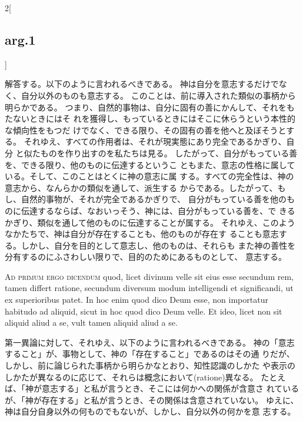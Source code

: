 \documentclass[paper=a4paper,fontsize=10pt,jafontsize=9pt,titlepage]{jlreq}
\begin{document}
\begin{paracol}{2}[\subsection{arg.1}]
\switchcolumn

解答する。以下のように言われるべきである。
神は自分を意志するだけでなく、自分以外のものも意志する。
このことは、前に導入された類似の事柄から明らかである。
つまり、自然的事物は、自分に固有の善にかんして、それをもたないときにはそ
 れを獲得し、もっているときにはそこに休らうという本性的な傾向性をもつだ
 けでなく、できる限り、その固有の善を他へと及ぼそうとする。
それゆえ、すべての作用者は、それが現実態にあり完全であるかぎり、自分
 と似たものを作り出すのを私たちは見る。
したがって、自分がもっている善を、できる限り、他のものに伝達するというこ
 ともまた、意志の性格に属している。そして、このことはとくに神の意志に属
 する。すべての完全性は、神の意志から、なんらかの類似を通して、派生する
 からである。したがって、もし、自然的事物が、それが完全であるかぎりで、
 自分がもっている善を他のものに伝達するならば、なおいっそう、神には、自分がもっている善を、で
 きるかぎり、類似を通して他のものに伝達することが属する。
それゆえ、このようなかたちで、神は自分が存在することも、他のものが存在す
 ることも意志する。しかし、自分を目的として意志し、他のものは、それらも
 また神の善性を分有するのにふさわしい限りで、目的のためにあるものとして、
 意志する。

\switchcolumn*[\subsection{ad.1}]


{\scshape Ad primum ergo dicendum} quod, licet divinum velle sit eius
 esse secundum rem, tamen differt ratione, secundum diversum modum
 intelligendi et significandi, ut ex superioribus patet. In hoc enim
 quod dico Deum esse, non importatur habitudo ad aliquid, sicut in hoc
 quod dico Deum velle. Et ideo, licet non sit aliquid aliud a se, vult
 tamen aliquid aliud a se.

\switchcolumn

第一異論に対して、それゆえ、以下のように言われるべきである。
神の「意志すること」が、事物として、神の「存在すること」であるのはその通
 りだが、しかし、前に論じられた事柄から明らかなとおり、知性認識のしかた
 や表示のしかたが異なるのに応じて、それらは概念において(ratione)異なる。
 たとえば、「神が意志する」と私が言うとき、そこには何かへの関係が含意さ
 れているが、「神が存在する」と私が言うとき、その関係は含意されていない。
 ゆえに、神は自分自身以外の何ものでもないが、しかし、自分以外の何かを意
 志する。

\switchcolumn*[\subsection{ad.2}]



\end{paracol}
\end{document}
